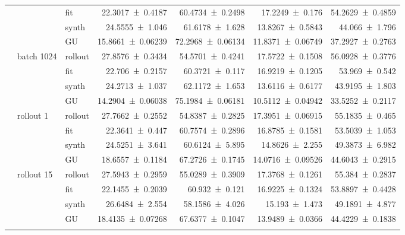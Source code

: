 {\begin{longtable}{@{}lllrrrr@{}}
     &  & fit & \num{22.3017+-0.4187} & \num{60.4734+-0.2498} & \num{17.2249+-0.176} & \num{54.2629+-0.4859} \\
     &  & synth & \num{24.5555+-1.046} & \num{61.6178+-1.628} & \num{13.8267+-0.5843} & \num{44.066+-1.796} \\
     &  & GU & \num{15.8661+-0.06239} & \num{72.2968+-0.06134} & \num{11.8371+-0.06749} & \num{37.2927+-0.2763} \\
    \addlinespace[2pt]
     & batch 1024 & rollout & \num{27.8576+-0.3434} & \num{54.5701+-0.4241} & \num{17.5722+-0.1508} & \num{56.0928+-0.3776} \\
     &  & fit & \num{22.706+-0.2157} & \num{60.3721+-0.117} & \num{16.9219+-0.1205} & \num{53.969+-0.542} \\
     &  & synth & \num{24.2713+-1.037} & \num{62.1172+-1.653} & \num{13.6116+-0.6177} & \num{43.9195+-1.803} \\
     &  & GU & \num{14.2904+-0.06038} & \num{75.1984+-0.06181} & \num{10.5112+-0.04942} & \num{33.5252+-0.2117} \\
    \addlinespace[2pt]
     & rollout 1 & rollout & \num{27.7662+-0.2552} & \num{54.8387+-0.2825} & \num{17.3951+-0.06915} & \num{55.1835+-0.465} \\
     &  & fit & \num{22.3641+-0.447} & \num{60.7574+-0.2896} & \num{16.8785+-0.1581} & \num{53.5039+-1.053} \\
     &  & synth & \num{24.5251+-3.641} & \num{60.6124+-5.895} & \num{14.8626+-2.255} & \num{49.3873+-6.982} \\
     &  & GU & \num{18.6557+-0.1184} & \num{67.2726+-0.1745} & \num{14.0716+-0.09526} & \num{44.6043+-0.2915} \\
    \addlinespace[2pt]
     & rollout 15 & rollout & \num{27.5943+-0.2959} & \num{55.0289+-0.3909} & \num{17.3768+-0.1261} & \num{55.384+-0.2837} \\
     &  & fit & \num{22.1455+-0.2039} & \num{60.932+-0.121} & \num{16.9225+-0.1324} & \num{53.8897+-0.4428} \\
     &  & synth & \num{26.6484+-2.554} & \num{58.1586+-4.026} & \num{15.193+-1.473} & \num{49.1891+-4.877} \\
     &  & GU & \num{18.4135+-0.07268} & \num{67.6377+-0.1047} & \num{13.9489+-0.0366} & \num{44.4229+-0.1838} \\
    \addlinespace[2pt]
  \end{longtable}
}

